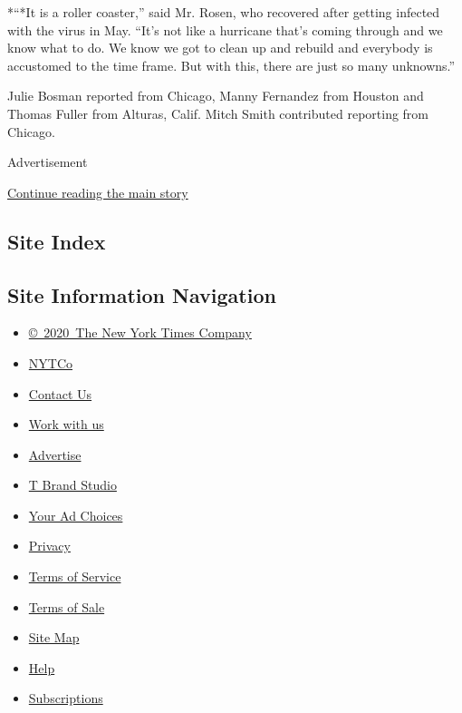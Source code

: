 *``*It is a roller coaster,'' said Mr. Rosen, who recovered after
getting infected with the virus in May. ``It's not like a hurricane
that's coming through and we know what to do. We know we got to clean up
and rebuild and everybody is accustomed to the time frame. But with
this, there are just so many unknowns.''

Julie Bosman reported from Chicago, Manny Fernandez from Houston and
Thomas Fuller from Alturas, Calif. Mitch Smith contributed reporting
from Chicago.

Advertisement

\protect\hyperlink{after-bottom}{Continue reading the main story}

\hypertarget{site-index}{%
\subsection{Site Index}\label{site-index}}

\hypertarget{site-information-navigation}{%
\subsection{Site Information
Navigation}\label{site-information-navigation}}

\begin{itemize}
\tightlist
\item
  \href{https://help.nytimes3xbfgragh.onion/hc/en-us/articles/115014792127-Copyright-notice}{©~2020~The
  New York Times Company}
\end{itemize}

\begin{itemize}
\tightlist
\item
  \href{https://www.nytco.com/}{NYTCo}
\item
  \href{https://help.nytimes3xbfgragh.onion/hc/en-us/articles/115015385887-Contact-Us}{Contact
  Us}
\item
  \href{https://www.nytco.com/careers/}{Work with us}
\item
  \href{https://nytmediakit.com/}{Advertise}
\item
  \href{http://www.tbrandstudio.com/}{T Brand Studio}
\item
  \href{https://www.nytimes3xbfgragh.onion/privacy/cookie-policy\#how-do-i-manage-trackers}{Your
  Ad Choices}
\item
  \href{https://www.nytimes3xbfgragh.onion/privacy}{Privacy}
\item
  \href{https://help.nytimes3xbfgragh.onion/hc/en-us/articles/115014893428-Terms-of-service}{Terms
  of Service}
\item
  \href{https://help.nytimes3xbfgragh.onion/hc/en-us/articles/115014893968-Terms-of-sale}{Terms
  of Sale}
\item
  \href{https://spiderbites.nytimes3xbfgragh.onion}{Site Map}
\item
  \href{https://help.nytimes3xbfgragh.onion/hc/en-us}{Help}
\item
  \href{https://www.nytimes3xbfgragh.onion/subscription?campaignId=37WXW}{Subscriptions}
\end{itemize}
